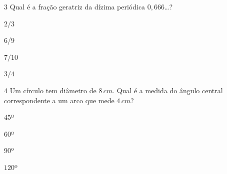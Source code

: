 
\num{3} Qual é a fração geratriz da dízima periódica $0,666$\ldots?

\begin{escolha}
\item $2/3$
\item $6$/9
\item $7/10$
\item $3/4$
\end{escolha}



\num{4}  Um círculo tem diâmetro de $8\,cm$. Qual é a medida do ângulo central
correspondente a um arco que mede $4\,cm$?

\begin{escolha}
\item $45$º
\item $60$º
\item $90$º
\item $120$º
\end{escolha}


